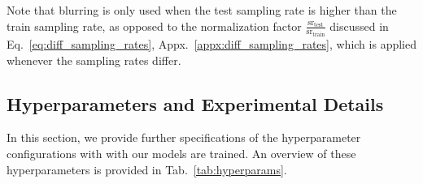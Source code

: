 \documentclass{article}
\begin{document}
\vspace{-2mm}
Note that blurring is only used when the test sampling rate is higher than the train sampling rate, as opposed to the normalization factor $\tfrac{\mathrm{sr}_\text{test}}{\mathrm{sr}_\text{train}}$ discussed in Eq.~\ref{eq:diff_sampling_rates}, Appx.~\ref{appx:diff_sampling_rates}, which is applied whenever the sampling rates differ.

\subsection{Hyperparameters and Experimental Details}\label{appx:hyperparams}
In this section, we provide further specifications of the hyperparameter configurations with with our models are trained. An overview of these hyperparameters is provided in Tab.~\ref{tab:hyperparams}.
\end{document}
